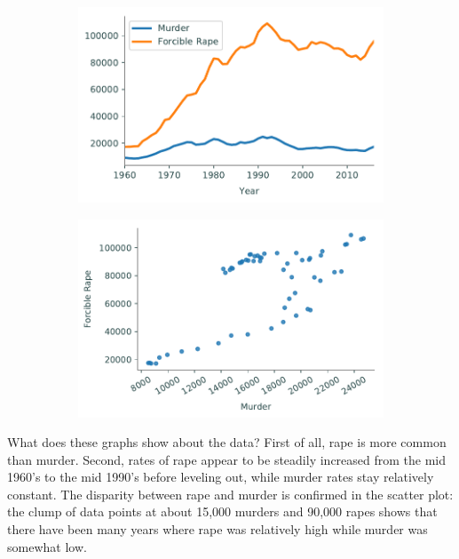 \begin{figure}[H] %
\captionsetup[subfigure]{justification=centering}
\centering
\begin{subfigure}{.49\textwidth}
    \includegraphics[width=\textwidth]{figures/line_compare.pdf}
\end{subfigure}
%
\begin{subfigure}{.49\textwidth}
    \includegraphics[width=\textwidth]{figures/scatter_compare.pdf}
\end{subfigure}
\end{figure}

What does these graphs show about the data?
First of all, rape is more common than murder.
Second, rates of rape appear to be steadily increased from the mid 1960's to the mid 1990's before leveling out, while murder rates stay relatively constant.
The disparity between rape and murder is confirmed in the scatter plot: the clump of data points at about 15,000 murders and 90,000 rapes shows that there have been many years where rape was relatively high while murder was somewhat low.

